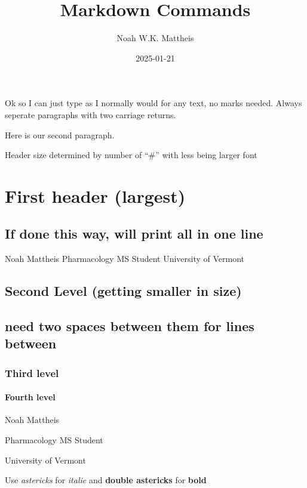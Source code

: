 \documentclass[
]{article}
\title{Markdown Commands}
\author{Noah W.K. Mattheis}
\date{2025-01-21}
\begin{document}
\maketitle

Ok so I can just type as I normally would for any text, no marks needed.
Always seperate paragraphs with two carriage returns.

Here is our second paragraph.

Header size determined by number of ``\#'' with less being larger font

\section{First header (largest)}\label{first-header-largest}

\subsection{If done this way, will print all in one
line}\label{if-done-this-way-will-print-all-in-one-line}

Noah Mattheis Pharmacology MS Student University of Vermont

\subsection{Second Level (getting smaller in
size)}\label{second-level-getting-smaller-in-size}

\subsection{need two spaces between them for lines
between}\label{need-two-spaces-between-them-for-lines-between}

\subsubsection{Third level}\label{third-level}

\paragraph{Fourth level}\label{fourth-level}

Noah Mattheis

Pharmacology MS Student

University of Vermont

Use \emph{astericks} for \emph{italic} and \textbf{double astericks} for
\textbf{bold}
\end{document}
